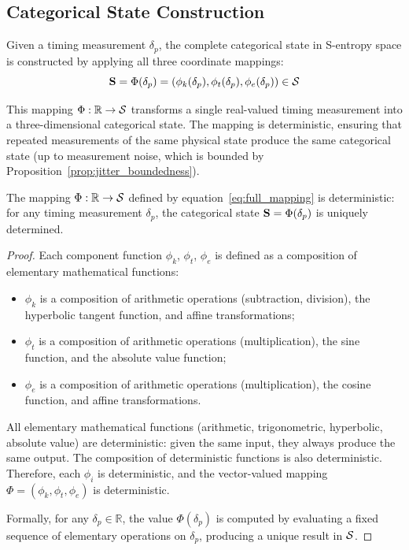 \subsection{Categorical State Construction}

Given a timing measurement $\delta_p$, the complete categorical state in S-entropy space is constructed by applying all three coordinate mappings:
\begin{equation}
\mathbf{S} = \Phi(\delta_p) = \left( \phi_k(\delta_p), \phi_t(\delta_p), \phi_e(\delta_p) \right) \in \mathcal{S}
\label{eq:full_mapping}
\end{equation}

This mapping $\Phi: \mathbb{R} \to \mathcal{S}$ transforms a single real-valued timing measurement into a three-dimensional categorical state. The mapping is deterministic, ensuring that repeated measurements of the same physical state produce the same categorical state (up to measurement noise, which is bounded by Proposition~\ref{prop:jitter_boundedness}).

\begin{theorem}
\label{thm:deterministic_mapping}
The mapping $\Phi: \mathbb{R} \to \mathcal{S}$ defined by equation~\eqref{eq:full_mapping} is deterministic: for any timing measurement $\delta_p$, the categorical state $\mathbf{S} = \Phi(\delta_p)$ is uniquely determined.
\end{theorem}

\begin{proof}
Each component function $\phi_k$, $\phi_t$, $\phi_e$ is defined as a composition of elementary mathematical functions:
\begin{itemize}
    \item $\phi_k$ is a composition of arithmetic operations (subtraction, division), the hyperbolic tangent function, and affine transformations;
    \item $\phi_t$ is a composition of arithmetic operations (multiplication), the sine function, and the absolute value function;
    \item $\phi_e$ is a composition of arithmetic operations (multiplication), the cosine function, and affine transformations.
\end{itemize}

All elementary mathematical functions (arithmetic, trigonometric, hyperbolic, absolute value) are deterministic: given the same input, they always produce the same output. The composition of deterministic functions is also deterministic. Therefore, each $\phi_i$ is deterministic, and the vector-valued mapping $\Phi = (\phi_k, \phi_t, \phi_e)$ is deterministic.

Formally, for any $\delta_p \in \mathbb{R}$, the value $\Phi(\delta_p)$ is computed by evaluating a fixed sequence of elementary operations on $\delta_p$, producing a unique result in $\mathcal{S}$.
\end{proof}

